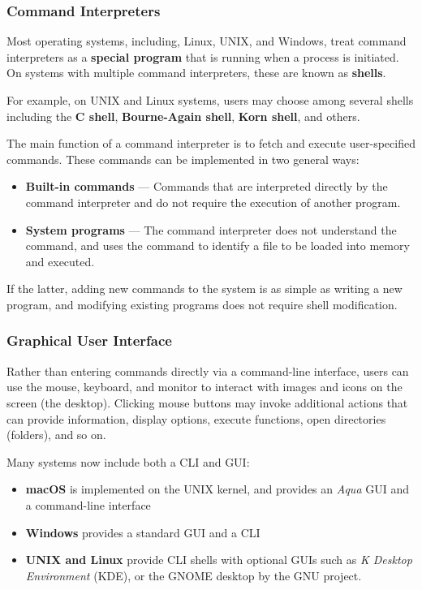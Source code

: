\documentclass{article}
\begin{document}
\subsubsection{Command Interpreters}
Most operating systems, including, Linux, UNIX, and Windows, treat
command interpreters as a \textbf{special program} that is running when
a process is initiated. On systems with multiple command interpreters,
these are known as \textbf{shells}.

For example, on UNIX and Linux systems, users may choose among several
shells including the \textbf{C shell}, \textbf{Bourne-Again shell},
\textbf{Korn shell}, and others.

The main function of a command interpreter is to fetch and execute
user-specified commands. These commands can be implemented in two
general ways:
\begin{itemize}
    \item \textbf{Built-in commands} --- Commands that are interpreted
          directly by the command interpreter and do not require the
          execution of another program.
    \item \textbf{System programs} --- The command interpreter does not
          understand the command, and uses the command to identify a file
          to be loaded into memory and executed.
\end{itemize}
If the latter, adding new commands to the system is as simple as
writing a new program, and modifying existing programs does not
require shell modification.
\subsubsection{Graphical User Interface}
Rather than entering commands directly via a command-line interface,
users can use the mouse, keyboard, and monitor to interact with images
and icons on the screen (the desktop). Clicking mouse buttons may
invoke additional actions that can provide information, display
options, execute functions, open directories (folders), and so on.

Many systems now include both a CLI and GUI:\@
\begin{itemize}
    \item \textbf{macOS} is implemented on the UNIX kernel, and provides
          an \textit{Aqua} GUI and a command-line interface
    \item \textbf{Windows} provides a standard GUI and a CLI
    \item \textbf{UNIX and Linux} provide CLI shells with optional GUIs
          such as \textit{K Desktop Environment} (KDE), or the GNOME
          desktop by the GNU project.
\end{itemize}
\end{document}
